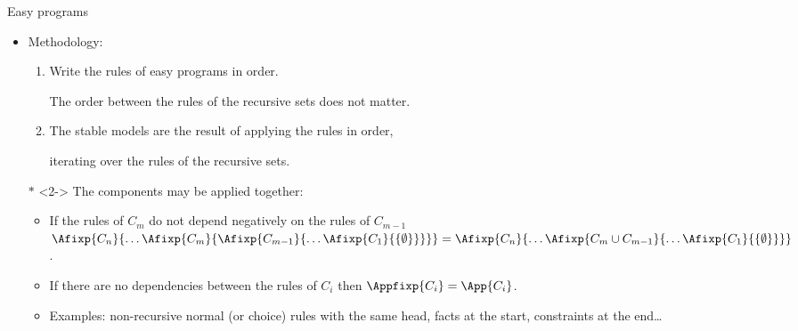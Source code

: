 \begin{frame}{Easy programs}
  \begin{itemize}
    \bigskip
    \item \alert<1>{Methodology:}
          \begin{enumerate}
            \item Write the rules of easy programs in order.\par
                  The order between the rules of the recursive sets does not matter.
            \item The stable models are the result of applying the rules in order, \par 
                  iterating over the rules of the recursive sets.
          \end{enumerate}
    \bigskip
    \item[$*$]<2-> The components may be \alert<2>{applied together}:
      \begin{itemize}
        \item 
        If the rules of $C_{m}$ \alert<2>{do not depend negatively} on the rules of $C_{m-1}$
        $\Afixp{C_n}{\ldots\Afixp{C_m}{\Afixp{C_{m-1}}{\ldots\Afixp{C_1}{\{\emptyset\}}}}} =
        \Afixp{C_n}{\ldots\Afixp{C_m \cup C_{m-1}}{\ldots\Afixp{C_1}{\{\emptyset\}}}}$.
        \vspace{2pt}
        \item If there are no dependencies between the rules of $C_i$ then
                 {$\Appfixp{{C_i}}=\App{C_i}$}.
        \item Examples: non-recursive normal (or choice) rules with the same head,
              facts at the start, constraints at the end\ldots  
    \end{itemize}
      
  \end{itemize}
\end{frame}
    
